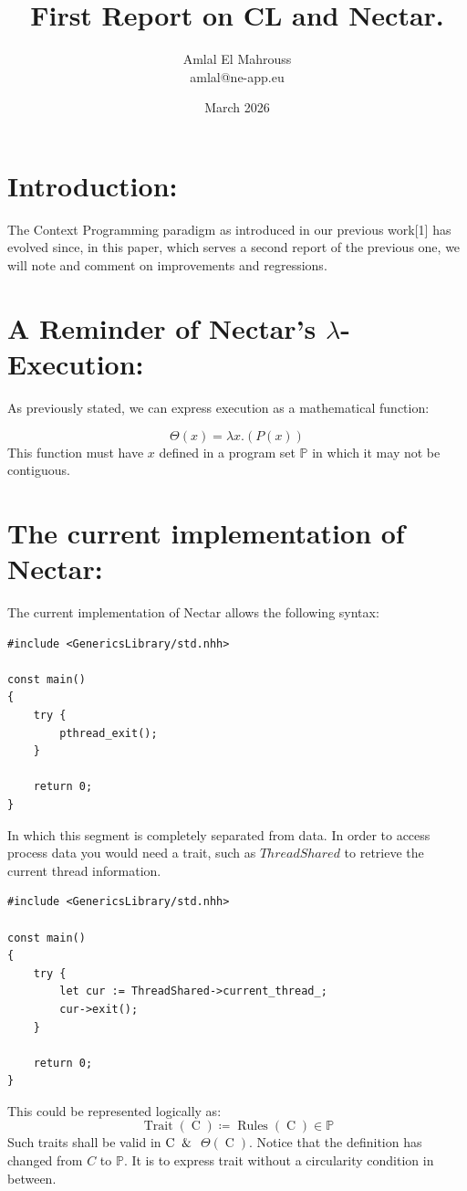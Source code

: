 \documentclass{article}
\title{First Report on CL and Nectar.}
\author{Amlal El Mahrouss\\amlal@ne-app.eu}
\date{March 2026}
\begin{document}
\maketitle

\section{Introduction:}

The Context Programming paradigm as introduced in our previous work[1] has evolved since, in this paper, which serves a second report of the previous one, we will note and comment on improvements and regressions.

\section{A Reminder of Nectar's $\lambda$-Execution:}

As previously stated, we can express execution as a mathematical function:

\begin{equation}
    \Theta(x) = \lambda x.(P(x))
\end{equation}
This function must have $x$ defined in a program set $\mathbb{P}$ in which it may not be contiguous.

\section{The current implementation of Nectar:}

The current implementation of Nectar allows the following syntax:

\begin{lstlisting}
#include <GenericsLibrary/std.nhh>

const main()
{
	try {
		pthread_exit();
	}
	
	return 0;
}
\end{lstlisting}
In which this segment is completely separated from data. In order to access process data you would need a trait, such as $ThreadShared$ to retrieve the current thread information.
 
\begin{lstlisting}
#include <GenericsLibrary/std.nhh>

const main()
{
	try {
		let cur := ThreadShared->current_thread_;
	    cur->exit();
    }
	
	return 0;
}
\end{lstlisting}
This could be represented logically as:
\begin{equation}
        \operatorname{Trait}(\operatorname{C}) \coloneqq \operatorname{Rules}(\operatorname{C}) \in \mathbb{P}
\end{equation}
Such traits shall be valid in $\operatorname{C} \And$ $\Theta(\operatorname{C})$. Notice that the definition has changed from $C$ to $\mathbb{P}$. It is to express trait without a circularity condition in between.
\end{document}
